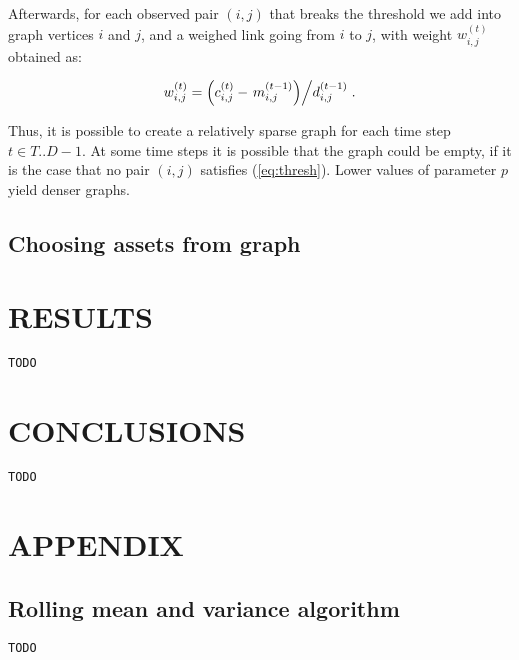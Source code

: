 \documentclass[letterpaper, 10 pt, conference]{ieeeconf}
\begin{document}
  Afterwards, for each observed pair $(i,j)$ that breaks the threshold we add into graph vertices $i$ and $j$, and a weighed link going from $i$ to $j$, with weight $w_{i,j}^{(t)}$ obtained as:
  
  \begin{equation}
    \label{eq:weight}
    w_{i,j}^{(t)} = \left(c_{i,j}^{(t)} - \left. m_{i,j}^{(t-1)}\right) \middle/ d_{i,j}^{(t-1)} \right..
  \end{equation}
  
  Thus, it is possible to create a relatively sparse graph for each time step $t \in T..D-1$.
  At some time steps it is possible that the graph could be empty, if it is the case that no pair $(i,j)$ satisfies (\ref{eq:thresh}).
  Lower values of parameter $p$ yield denser graphs.
  
  \subsection{Choosing assets from graph}
    
  \section{RESULTS}
  
  \verb|TODO|

  \section{CONCLUSIONS}
  
  \verb|TODO|
    
  
  \section*{APPENDIX}
  
  \subsection{Rolling mean and variance algorithm}
  \label{sub:rolling}
  
  \verb|TODO|
\end{document}
